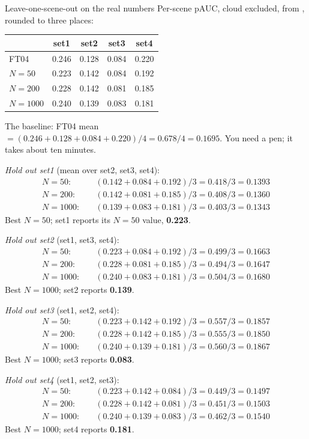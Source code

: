 \begin{worked}[label={we:scoringgains:loso}]{Leave-one-scene-out on the real numbers}
Per-scene pAUC, cloud excluded, from , rounded to three places:
\begin{center}
\small
\begin{tabular}{lcccc}
\toprule
 & set1 & set2 & set3 & set4 \\
\midrule
FT04 & 0.246 & 0.128 & 0.084 & 0.220 \\
$N = 50$ & 0.223 & 0.142 & 0.084 & 0.192 \\
$N = 200$ & 0.228 & 0.142 & 0.081 & 0.185 \\
$N = 1000$ & 0.240 & 0.139 & 0.083 & 0.181 \\
\bottomrule
\end{tabular}
\end{center}
The baseline: FT04 mean $= (0.246 + 0.128 + 0.084 + 0.220)/4 = 0.678/4 = 0.1695$. You need a pen; it takes about ten minutes.

\emph{Hold out set1} (mean over set2, set3, set4):
\begin{align*}
N = 50:&\quad (0.142 + 0.084 + 0.192)/3 = 0.418/3 = 0.1393\\
N = 200:&\quad (0.142 + 0.081 + 0.185)/3 = 0.408/3 = 0.1360\\
N = 1000:&\quad (0.139 + 0.083 + 0.181)/3 = 0.403/3 = 0.1343
\end{align*}
Best $N = 50$; set1 reports its $N = 50$ value, \textbf{0.223}.

\emph{Hold out set2} (set1, set3, set4):
\begin{align*}
N = 50:&\quad (0.223 + 0.084 + 0.192)/3 = 0.499/3 = 0.1663\\
N = 200:&\quad (0.228 + 0.081 + 0.185)/3 = 0.494/3 = 0.1647\\
N = 1000:&\quad (0.240 + 0.083 + 0.181)/3 = 0.504/3 = 0.1680
\end{align*}
Best $N = 1000$; set2 reports \textbf{0.139}.

\emph{Hold out set3} (set1, set2, set4):
\begin{align*}
N = 50:&\quad (0.223 + 0.142 + 0.192)/3 = 0.557/3 = 0.1857\\
N = 200:&\quad (0.228 + 0.142 + 0.185)/3 = 0.555/3 = 0.1850\\
N = 1000:&\quad (0.240 + 0.139 + 0.181)/3 = 0.560/3 = 0.1867
\end{align*}
Best $N = 1000$; set3 reports \textbf{0.083}.

\emph{Hold out set4} (set1, set2, set3):
\begin{align*}
N = 50:&\quad (0.223 + 0.142 + 0.084)/3 = 0.449/3 = 0.1497\\
N = 200:&\quad (0.228 + 0.142 + 0.081)/3 = 0.451/3 = 0.1503\\
N = 1000:&\quad (0.240 + 0.139 + 0.083)/3 = 0.462/3 = 0.1540
\end{align*}
Best $N = 1000$; set4 reports \textbf{0.181}.


\end{worked}
